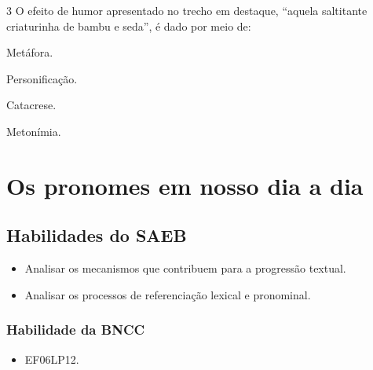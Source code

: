 \num{3} O efeito de humor apresentado no trecho em destaque, ``aquela saltitante
criaturinha de bambu e seda'', é dado por meio de:

\begin{escolha}
\item Metáfora.
\item Personificação.
\item Catacrese.
\item Metonímia.
\end{escolha}




\chapter{Os pronomes em nosso dia a dia}

\section*{Habilidades do SAEB }
\begin{itemize}
\item Analisar os mecanismos que contribuem para a
progressão textual. 
\item Analisar os processos de referenciação lexical e
pronominal.
\end{itemize}

\subsection*{Habilidade da BNCC}
\begin{itemize}
\item EF06LP12.
\end{itemize}

